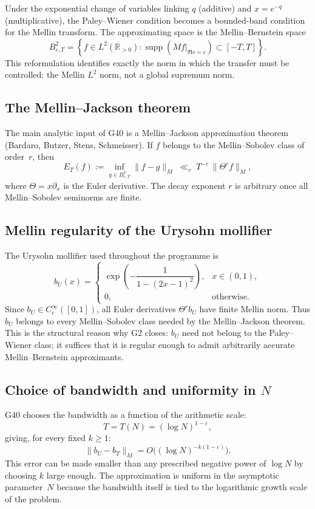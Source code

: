 \documentclass[11pt,a4paper]{article}
\begin{document}
Under the exponential change of variables linking $q$ (additive) and $x=e^{-q}$ (multiplicative), the Paley--Wiener condition becomes a bounded-band condition for the Mellin transform.  The approximating space is the Mellin--Bernstein space
\[
B^2_{c,T} = \left\{ f\in L^2(\mathbb{R}_{>0}) : \operatorname{supp}(Mf|_{\Re s=c})\subset[-T,T] \right\}.
\]
This reformulation identifies exactly the norm in which the transfer must be controlled: the Mellin $L^2$ norm, not a global supremum norm.

\subsection{The Mellin--Jackson theorem}

The main analytic input of G40 is a Mellin--Jackson approximation theorem (Bardaro, Butzer, Stens, Schmeisser).  If $f$ belongs to the Mellin--Sobolev class of order~$r$, then
\[
E_T(f) := \inf_{g\in B^2_{c,T}} \|f-g\|_M \;\ll_r\; T^{-r}\,\|\Theta^r f\|_M,
\]
where $\Theta=x\partial_x$ is the Euler derivative.  The decay exponent $r$ is arbitrary once all Mellin--Sobolev seminorms are finite.

\subsection{Mellin regularity of the Urysohn mollifier}

The Urysohn mollifier used throughout the programme is
\[
b_U(x) = \begin{cases} \exp\!\left(-\dfrac{1}{1-(2x-1)^2}\right), & x\in(0,1), \\[1ex] 0, & \text{otherwise.} \end{cases}
\]
Since $b_U\in C_c^\infty([0,1])$, all Euler derivatives $\Theta^r b_U$ have finite Mellin norm.  Thus $b_U$ belongs to every Mellin--Sobolev class needed by the Mellin--Jackson theorem.  This is the structural reason why G2 closes: $b_U$ need not belong to the Paley--Wiener class; it suffices that it is regular enough to admit arbitrarily accurate Mellin--Bernstein approximants.

\subsection{Choice of bandwidth and uniformity in $N$}

G40 chooses the bandwidth as a function of the arithmetic scale:
\[
T=T(N)=(\log N)^{1-\varepsilon},
\]
giving, for every fixed $k\ge 1$:
\[
\|b_U - b_T\|_M = O\!\big( (\log N)^{-k(1-\varepsilon)} \big).
\]
This error can be made smaller than any prescribed negative power of $\log N$ by choosing $k$ large enough.  The approximation is uniform in the asymptotic parameter~$N$ because the bandwidth itself is tied to the logarithmic growth scale of the problem.
\end{document}
